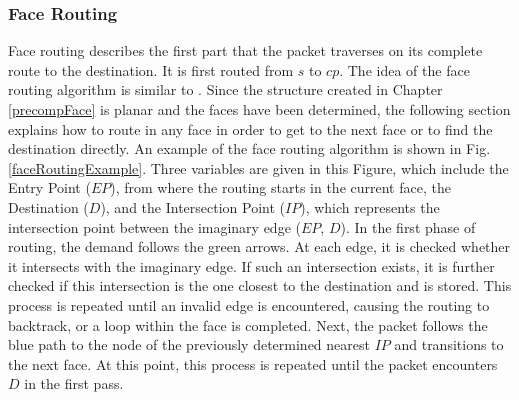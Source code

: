 \documentclass[conference]{IEEEtran}
\begin{document}
\subsubsection{Face Routing}
\label{routingFaces}
Face routing describes the first part that the packet traverses on its complete route to the destination. It is first routed from $s$ to $cp$. 
The idea of the face routing algorithm is similar to \cite{facerouting}.
Since the structure created in Chapter \ref{precompFace} is planar and the faces have been determined, the following section explains how to route in any face in order to get to the next face or to find the destination directly.
An example of the face routing  algorithm is shown in Fig. \ref{faceRoutingExample}. 
Three variables are given in this Figure, which include the Entry Point ($EP$), from where the routing starts in the current face, the Destination ($D$), and the Intersection Point ($IP$), which represents the intersection point between the imaginary edge ($EP$, $D$).
In the first phase of routing, the demand follows the green arrows. At each edge, it is checked whether it intersects with the imaginary edge. If such an intersection exists, it is further checked if this intersection is the one closest to the destination and is stored. This process is repeated until an invalid edge is encountered, causing the routing to backtrack, or a loop within the face is completed.
Next, the packet follows the blue path to the node of the previously determined nearest $IP$ and transitions to the next face. At this point, this process is repeated until the packet encounters $D$ in the first pass.
\end{document}
